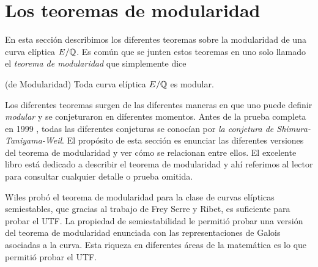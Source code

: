 \section{Los teoremas de modularidad}

En esta sección describimos los diferentes teoremas sobre la modularidad de una curva elíptica $E/\mathbb{Q}$. Es común que se junten estos teoremas en uno solo llamado el \emph{teorema de modularidad} que simplemente dice
\begin{thm}(de Modularidad)
	Toda curva elíptica $E/\mathbb{Q}$ es modular.
\end{thm}
Los diferentes teoremas surgen de las diferentes maneras en que uno puede definir \emph{modular} y se conjeturaron en diferentes momentos. Antes de la prueba completa en 1999 \cite{s}, todas las diferentes conjeturas se conocían por \emph{la conjetura de Shimura-Taniyama-Weil}. El propósito de esta sección es enunciar las diferentes versiones del teorema de modularidad y ver cómo se relacionan entre ellos. El excelente libro \cite{DiamonShurman} está dedicado a describir el teorema de modularidad y ahí referimos al lector para consultar cualquier detalle o prueba omitida. 

Wiles probó el teorema de modularidad para la clase de curvas elípticas semiestables, que gracias al trabajo de Frey Serre y Ribet, es suficiente para probar el UTF. La propiedad de semiestabilidad le permitió probar una versión del teorema de modularidad enunciada con las representaciones de Galois asociadas a la curva. Esta riqueza en diferentes áreas de la matemática es lo que permitió probar el UTF. 
